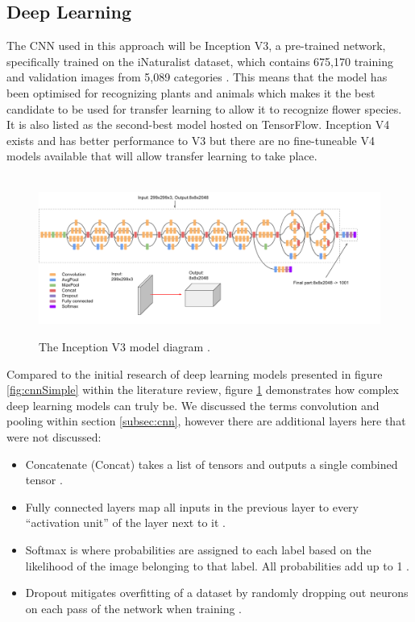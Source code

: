 \documentclass[12pt,a4paper]{report}
\begin{document}
\subsection{Deep Learning}

The CNN used in this approach will be Inception V3, a pre-trained network, specifically trained on the iNaturalist 
dataset, which contains 675,170 training and validation images from 5,089 categories \citep{paperswithcode}. 
This means that the model has been optimised for recognizing plants and animals which makes it the best candidate to be 
used for transfer learning to allow it to recognize flower species. It is also listed as the second-best model hosted on
TensorFlow. Inception V4 exists and has better performance to V3 but there are no fine-tuneable V4 models available that
will allow transfer learning to take place.   

\begin{figure}[h]\
    \centering
    \includegraphics[width=\textwidth]{inceptionv3.png}
    \caption{The Inception V3 model diagram \citep{GoogleCloud}.}
    \label{fig:inception}
\end{figure}

Compared to the initial research of deep learning models presented in figure \ref{fig:cnnSimple} within the literature 
review, figure \ref{fig:inception} demonstrates how complex deep learning models can truly be. 
We discussed the terms convolution and pooling within section \ref{subsec:cnn}, however there are additional layers here that were 
not discussed:

\begin{itemize}
    \item Concatenate (Concat) takes a list of tensors and outputs a single combined tensor \citep{kerasconcat}.
    \item Fully connected layers map all inputs in the previous layer to every “activation unit” of the layer next to it
\citep{singhsurya}.
    \item Softmax is where probabilities are assigned to each label based on the likelihood of the image belonging to 
that label. All probabilities add up to 1 \citep{googledevcnn}. 
    \item Dropout mitigates overfitting of a dataset by randomly dropping out neurons on each pass of the network when 
    training \citep{seb}. 
\end{itemize}
\end{document}

